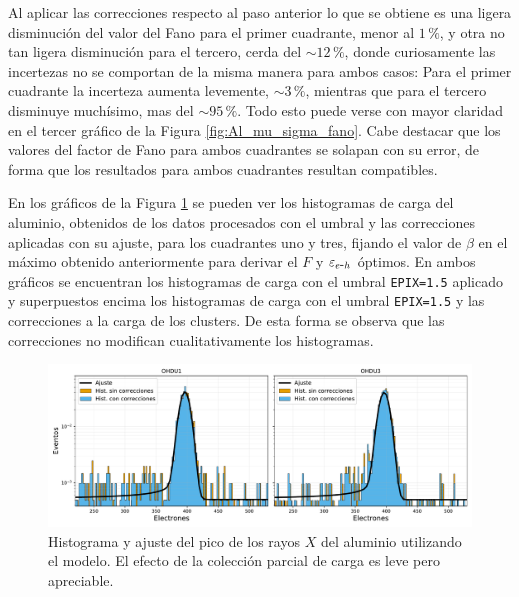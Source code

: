 Al aplicar las correcciones respecto al paso anterior lo que se obtiene es una ligera disminución del valor del Fano para el primer cuadrante, menor al $1\,\%$, y otra no tan ligera disminución para el tercero, cerda del $\sim 12\,\%$, donde curiosamente las incertezas no se comportan de la misma manera para ambos casos: Para el primer cuadrante la incerteza aumenta levemente, $\sim 3\,\%$, mientras que para el tercero disminuye muchísimo, mas del $\sim 95\,\%$. Todo esto puede verse con mayor claridad en el tercer gráfico de la Figura \ref{fig:Al_mu_sigma_fano}. Cabe destacar que los valores del factor de Fano para ambos cuadrantes se solapan con su error, de forma que los resultados para ambos cuadrantes resultan compatibles.

En los gráficos de la Figura \ref{fig:Al_OHDU1y3_EPIX15_Corr} se pueden ver los histogramas de carga del aluminio, obtenidos de los datos procesados con el umbral y las correcciones aplicadas con su ajuste, para los cuadrantes uno y tres, fijando el valor de $\beta$ en el máximo obtenido anteriormente para derivar el $F$ y $\varepsilon_{e\mbox{-}h}$ óptimos. En ambos gráficos se encuentran los histogramas de carga con el umbral \verb|EPIX=1.5| aplicado y superpuestos encima los histogramas de carga con el umbral \verb|EPIX=1.5| y las correcciones a la carga de los clusters. De esta forma se observa que las correcciones no modifican cualitativamente los histogramas.
\begin{figure}[h]
    \centering
        \includegraphics[scale=0.5]{Figs/Al_hists_ohdu1y3_dobles.pdf}
    \caption{\footnotesize{Histograma y ajuste del pico de los rayos $X$ del aluminio utilizando el modelo. El efecto de la colección parcial de carga es leve pero apreciable.}}
    \label{fig:Al_OHDU1y3_EPIX15_Corr}
\end{figure}

